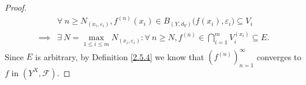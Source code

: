 \begin{proof}
\begin{align*}
                 & \forall\ n \geq N_{(x_i, \varepsilon_i)}, f^{(n)}(x_i) \in B_{(Y, d_Y)}\big(f(x_i), \varepsilon_i\big) \subseteq V_i                                                               \\
        \implies & \exists\ N = \max_{1 \leq i \leq m} N_{(x_i, \varepsilon_i)} : \forall\ n \geq N, f^{(n)} \in \bigcap_{i = 1}^m V_i^{(x_i)} \subseteq E.
    \end{align*}
    Since \(E\) is arbitrary, by Definition \ref{2.5.4} we know that \((f^{(n)})_{n = 1}^\infty\) converges to \(f\) in \((Y^X, \mathcal{F})\).
\end{proof}